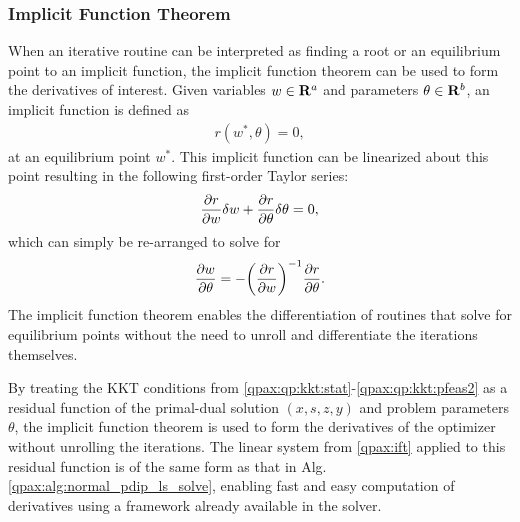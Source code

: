 \subsubsection{Implicit Function Theorem}
%
%
When an iterative routine can be interpreted as finding a root or an equilibrium point to an implicit function, the implicit function theorem can be used to form the derivatives of interest. Given variables $w \in \mathbf{R}^{a}$ and parameters $\theta \in \mathbf{R}^{b}$, an implicit function is defined as
\begin{align}
    r(w^*, \theta) = 0,
\end{align}
at an equilibrium point $w^*$. This implicit function can be linearized about this point resulting in the following first-order Taylor series:
\begin{align}
    \frac{\partial { r }}{ \partial { w }} \delta w + \frac{\partial { r }}{ \partial { \theta }} \delta \theta = 0 ,
\end{align}
which can simply be re-arranged to solve for
\begin{align}
    \frac{\partial { w }}{ \partial { \theta }} = -\bigg(\frac{\partial { r }}{ \partial { w }} \bigg)^{-1} \frac{\partial { r }}{ \partial { \theta }}. \label{qpax:ift}
\end{align}
The implicit function theorem enables the differentiation of routines that solve for equilibrium points without the need to unroll and differentiate the iterations themselves.

By treating the KKT conditions from \eqref{qpax:qp:kkt:stat}-\eqref{qpax:qp:kkt:pfeas2} as a residual function of the primal-dual solution $(x, s, z, y)$ and problem parameters $\theta$, the implicit function theorem is used to form the derivatives of the optimizer without unrolling the iterations. The linear system from \eqref{qpax:ift} applied to this residual function is of the same form as that in Alg. \eqref{qpax:alg:normal_pdip_ls_solve}, enabling fast and easy computation of derivatives using a framework already available in the solver.
%
%
